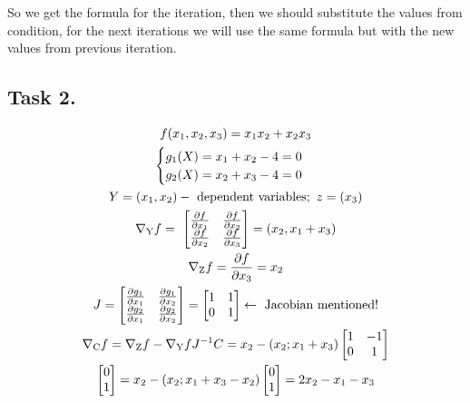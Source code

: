 \documentclass{article}
\begin{document}
So we get the formula for the iteration, then we should substitute the values from condition, for the next iterations we
will use the same formula but with the new values from previous iteration.

\newpage
\subsection*{Task 2.}

\addtolength{\jot}{2pt}
\begin{fleqn}[1\parindent]
  \begin{gather*}
    f(x_1,x_2,x_3) = x_1x_2+x_2x_3 \\ 
    \begin{cases}
      g_1(X) = x_1+x_2-4=0 \\ 
      g_2(X) = x_2+x_3-4 = 0
    \end{cases} \\
    Y = (x_1,x_2) - \text{ dependent variables};\ z = (x_3) \\ 
    \nabla{\textsubscript{Y}f}=\ 
    \begin{bmatrix}
      \frac{\partial f}{\partial x_1} & \frac{\partial f}{\partial x_2}\\
      \frac{\partial f}{\partial x_2} & \frac{\partial f}{\partial x_3}
    \end{bmatrix} = (x_2,x_1+x_3) \\
    \nabla{\textsubscript{Z}f} = \frac{\partial f}{\partial x_3} = x_2 \\
    J = \begin{bmatrix}
      \frac{\partial g_1}{\partial x_1}&\frac{\partial g_1}{\partial x_2}\\
      \frac{\partial g_2}{\partial x_1}&\frac{\partial g_2}{\partial x_2}
    \end{bmatrix}=\begin{bmatrix}1&1\\0&1\end{bmatrix} \leftarrow \text{ Jacobian mentioned!} \\
    \nabla \textsubscript{C}f=\nabla{\textsubscript{Z}f} - \nabla{\textsubscript{Y}f}J^{-1}C =
        x_2-(x_2;x_1+x_3)\begin{bmatrix}1&-1\\0&1\end{bmatrix} \\
    \begin{bmatrix}0\\1\end{bmatrix}=x_2-(x_2;x_1+x_3-x_2)\begin{bmatrix}0\\1\end{bmatrix}=2x_2-x_1-x_3 \\

\end{gather*}
\end{fleqn}
\end{document}
